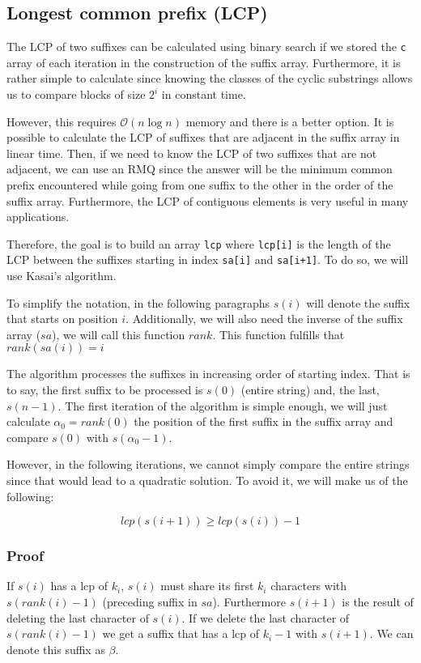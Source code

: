 \subsection{Longest common prefix (LCP)}
The LCP of two suffixes can be calculated using binary search if we
stored the \texttt{c} array of each iteration in the construction 
of the suffix array. Furthermore, it is rather simple to calculate 
since knowing the classes of the cyclic substrings allows us to 
compare blocks of size $2^i$ in constant time.

However, this requires $\mathcal{O}(n\log n)$ memory and there is a
better option. It is possible to calculate the LCP of suffixes that
are adjacent in the suffix array in linear time. 
Then, if we need to know the LCP
of two suffixes that are not adjacent, we can use an RMQ since the
answer will be the minimum common prefix encountered while going 
from one suffix to the other in the order of the suffix array.
Furthermore, the LCP of contiguous elements is very useful in many
applications.

Therefore, the goal is to build an array \texttt{lcp} where 
\texttt{lcp[i]} is the length of the LCP between the suffixes starting
in index \texttt{sa[i]} and \texttt{sa[i+1]}. To do so, we will
use Kasai's algorithm.

To simplify the notation, in the following paragraphs $s(i)$ will
denote the suffix that starts on position $i$. Additionally,
we will also need the inverse of the suffix array ($sa$), we will call
this function $rank$. This function fulfills that $rank(sa(i))=i$

The algorithm processes the suffixes in increasing order of starting
index. That is to say, the first suffix to be processed is $s(0)$ 
(entire string) and, the last, $s(n-1)$. 
The first iteration of the algorithm is 
simple enough, we will just calculate $\alpha_0 = rank(0)$ the 
position of the first suffix in the suffix array and compare 
$s(0)$ with $s(\alpha_0-1)$. 

However, in the following iterations, we cannot simply compare 
the entire strings since that would lead to a quadratic solution.
To avoid it, we will make us of the following:

\begin{equation}
		lcp(s(i+1)) \ge lcp(s(i)) -1
		\label{eq:lcp}
\end{equation}
\subsubsection*{Proof}
If $s(i)$ has a lcp of $k_i$, $s(i)$ must share its first
$k_i$ characters with $s(rank(i)-1)$ (preceding suffix in $sa$).
Furthermore $s(i+1)$ is the result of deleting the last character
of $s(i)$. If we delete the last character of $s(rank(i)-1)$ we
get a suffix that has a lcp of $k_i-1$ with $s(i+1)$. We can 
denote this suffix as $\beta$. 

